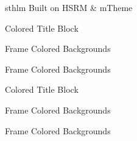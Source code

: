 \documentclass[newPxFont]{beamer}
\begin{document}
\begin{frame}[c]{sthlm Built on HSRM \& mTheme}
\begingroup
{}
\begin{frame}[plain]{Colored Title Block}



\end{frame}
\endgroup

\begingroup
{}
\begin{frame}{Frame Colored Backgrounds}


\end{frame}
\endgroup

\begingroup
{}
\begin{frame}{Frame Colored Backgrounds}


\end{frame}
\endgroup

\begingroup
{}
\begin{frame}[plain]{Colored Title Block}



\end{frame}
\endgroup

\begingroup
{}
\begin{frame}{Frame Colored Backgrounds}


\end{frame}
\endgroup

\begingroup
{}
\begin{frame}{Frame Colored Backgrounds}


\end{frame}
\end{frame}
\end{document}
